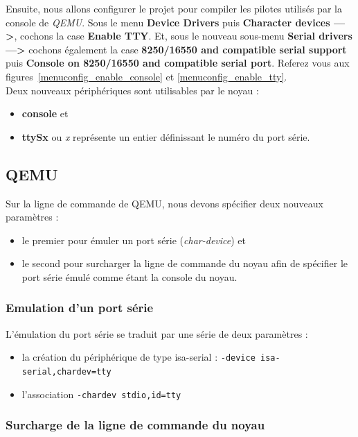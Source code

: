 \documentclass[a4paper]{article}
\begin{document}
Ensuite, nous allons configurer le projet pour compiler les pilotes utilisés par la console de \textit{QEMU}. Sous le menu \textbf{Device Drivers} puis \textbf{Character devices  --->}, cochons la case \textbf{Enable TTY}. Et, sous le nouveau sous-menu \textbf{Serial drivers  --->} cochons également la case \textbf{8250/16550 and compatible serial support} puis \textbf{Console on 8250/16550 and compatible serial port}. Referez vous aux figures~\ref{menuconfig_enable_console} et \ref{menuconfig_enable_tty}.\\

Deux nouveaux périphériques sont utilisables par le noyau :
\begin{itemize}
\item \textbf{console} et
\item \textbf{ttySx} ou \textit{x} représente un entier définissant le numéro du port série.
\end{itemize}

\subsection{QEMU}

Sur la ligne de commande de QEMU, nous devons spécifier deux nouveaux paramètres :
\begin{itemize}
\item le premier pour émuler un port série (\textit{char-device}) et
\item le second pour surcharger la ligne de commande du noyau afin de spécifier le port série émulé comme étant la console du noyau.
\end{itemize}

\subsubsection{Emulation d'un port série}

L'émulation du port série se traduit par une série de deux paramètres :
\begin{itemize}
\item la création du périphérique de type isa-serial : \lstset{language=sh}\lstinline{-device isa-serial,chardev=tty}
\item l'association \lstset{language=sh}\lstinline{-chardev stdio,id=tty}
\end{itemize}

\subsubsection{Surcharge de la ligne de commande du noyau}
\end{document}
